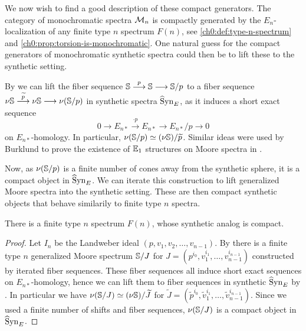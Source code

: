 
We now wish to find a good description of these compact generators. The category of monochromatic spectra $\Mn$ is compactly generated by the $E_n$-localization of any finite type $n$ spectrum $F(n)$, see \cref{ch0:def:type-n-spectrum} and \cref{ch0:prop:torsion-is-monochromatic}. One natural guess for the compact generators of monochromatic synthetic spectra could then be to lift these to the synthetic setting. 

\begin{construction}
    By \cite[4.23]{pstragowski_2022} we can lift the fiber sequence $\S\overset{p}\to\S\to\S/p$ to a fiber sequence $\nu \S \overset{\widetilde{p}}\to \nu \S\to \nu (\S/p)$ in synthetic spectra $\hSynE$, as it induces a short exact sequence 
    \[0\to E_{n*} \overset{\cdot p}\to E_{n*}\to E_{n*}/p\to 0\]
    on $E_{n*}$-homology. In particular, $\nu (\S/p)\simeq (\nu \S)/\widetilde{p}$. Similar ideas were used by Burklund to prove the existence of $\E_1$ structures on Moore spectra in \cite{burklund_2022}. 
    
    Now, as $\nu (\S/p)$ is a finite number of cones away from the synthetic sphere, it is a compact object in $\hSynE$. We can iterate this construction to lift generalized Moore spectra into the synthetic setting. These are then compact synthetic objects that behave similarily to finite type $n$ spectra. 
\end{construction}

\begin{lemma}
    There is a finite type $n$ spectrum $F(n)$, whose synthetic analog is compact. 
\end{lemma}
\begin{proof}
    Let $I_n$ be the Landweber ideal $(p,v_1, v_2, \ldots, v_{n-1})$. By \cite[4.14]{hovey-strickland_99} there is a finite type $n$ generalized Moore spectrum $\S/J$ for $J=(p^{i_0}, v_1^{i_1}, \ldots, v_{n-1}^{i_{n-1}})$ constructed by iterated fiber sequences. These fiber sequences all induce short exact sequences on $E_{n*}$-homology, hence we can lift them to fiber sequences in synthetic $\hSynE$ by \cite[4.23]{pstragowski_2022}. In particular we have $\nu (\S/J) \simeq (\nu \S)/\widetilde{J}$ for $\widetilde{J} = (\widetilde{p}^{i_0}, \widetilde{v}_1^{i_1}, \ldots, \widetilde{v}_{n-1}^{i_{n-1}})$. Since we used a finite number of shifts and fiber sequences, $\nu (\S/J)$ is a compact object in $\hSynE$. 
\end{proof}

